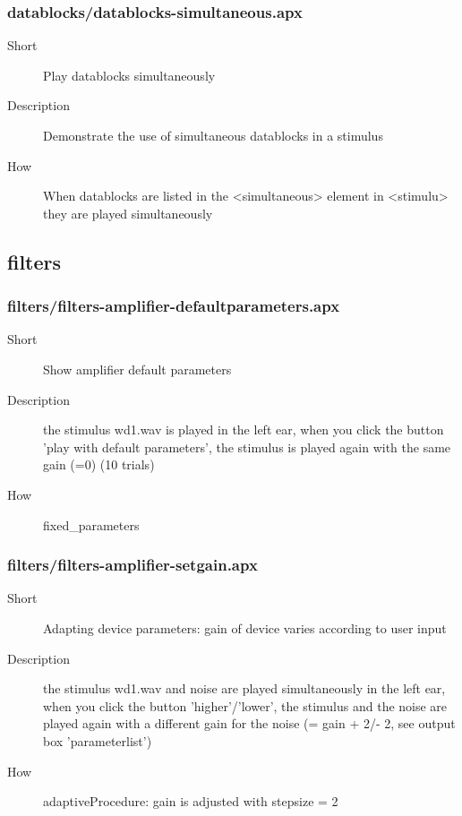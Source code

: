\subsubsection{datablocks/datablocks-simultaneous.apx}
\begin{description}
\item[Short] 
 Play datablocks simultaneously
\item[Description] 
 Demonstrate the use of simultaneous datablocks in a stimulus
\item[How] 
 When datablocks are listed in the \textless{}simultaneous\textgreater{} element in \textless{}stimulu\textgreater{} they are played simultaneously
\end{description}

\subsection{filters}
\subsubsection{filters/filters-amplifier-defaultparameters.apx}
\begin{description}
\item[Short] 
 Show amplifier default parameters
\item[Description] 
 the stimulus wd1.wav is played in the left ear, when you click the button 'play with default parameters', the stimulus is played again with the same gain (=0) (10 trials)
\item[How] 
 fixed\_parameters
\end{description}

\subsubsection{filters/filters-amplifier-setgain.apx}
\begin{description}
\item[Short] 
 Adapting device parameters: gain of device varies according to user input
\item[Description] 
 the stimulus wd1.wav and noise are played simultaneously in the left ear, when you click the button 'higher'/'lower', the stimulus and the noise are played again with a different gain for the noise (= gain + 2/- 2, see output box 'parameterlist')
\item[How] 
 adaptiveProcedure: gain is adjusted with stepsize = 2
\end{description}

